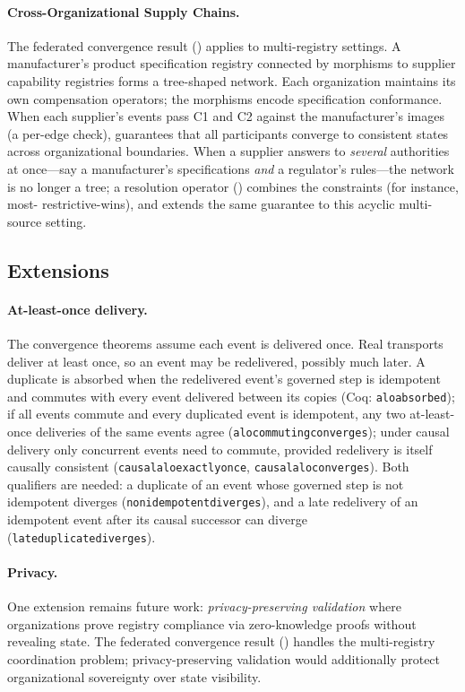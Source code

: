 \documentclass[11pt,a4paper]{article}
\theoremstyle{plain}
\theoremstyle{definition}
\theoremstyle{remark}
\renewcommand{\_}{\textunderscore\allowbreak}
\begin{document}
\paragraph{Cross-Organizational Supply Chains.}
The federated convergence result () applies to
multi-registry settings.  A manufacturer's product specification registry
connected by morphisms to supplier capability registries forms a tree-shaped
network.  Each organization maintains its own compensation operators; the
morphisms encode specification conformance.  When each supplier's events pass
C1 and C2 against the manufacturer's images (a per-edge check),
 guarantees that all participants converge to
consistent states across organizational boundaries.  When a supplier answers to \emph{several}
authorities at once---say a manufacturer's specifications \emph{and} a
regulator's rules---the network is no longer a tree; a resolution operator
() combines the constraints (for instance, most-
restrictive-wins), and  extends the same
guarantee to this acyclic multi-source setting.

\subsection{Extensions}

\paragraph{At-least-once delivery.}
The convergence theorems assume each event is delivered once.  Real transports
deliver at least once, so an event may be redelivered, possibly much later.  A
duplicate is absorbed when the redelivered event's governed step is idempotent
and commutes with every event delivered between its copies (Coq:
\texttt{alo\_absorbed}); if all events commute and every duplicated event is
idempotent, any two at-least-once deliveries of the same events agree
(\texttt{alo\_commuting\_converges}); under causal delivery only concurrent
events need to commute, provided redelivery is itself causally consistent
(\texttt{causal\_alo\_exactly\_once}, \texttt{causal\_alo\_converges}).
Both qualifiers are needed: a duplicate of an event whose governed step is not
idempotent diverges (\texttt{non\_idempotent\_diverges}), and a late
redelivery of an idempotent event after its causal successor can diverge
(\texttt{late\_duplicate\_diverges}).

\paragraph{Privacy.}
One extension remains future work: \emph{privacy-preserving validation} where
organizations prove registry compliance via zero-knowledge proofs without
revealing state.  The federated convergence result ()
handles the multi-registry coordination problem; privacy-preserving validation
would additionally protect organizational sovereignty over state visibility.
\end{document}
